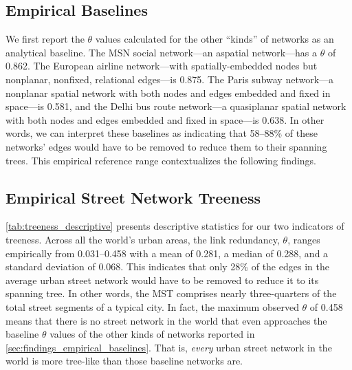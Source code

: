 \documentclass[12pt,letterpaper]{article} %
\begin{document}
\subsection{Empirical Baselines}\label{sec:findings_empirical_baselines}

We first report the $\theta$ values calculated for the other \enquote{kinds} of networks as an analytical baseline. The MSN social network---an aspatial network---has a $\theta$ of 0.862. The European airline network---with spatially-embedded nodes but nonplanar, nonfixed, relational edges---is 0.875. The Paris subway network---a nonplanar spatial network with both nodes and edges embedded and fixed in space---is 0.581, and the Delhi bus route network---a quasiplanar spatial network with both nodes and edges embedded and fixed in space---is 0.638. In other words, we can interpret these baselines as indicating that 58--88\% of these networks' edges would have to be removed to reduce them to their spanning trees. This empirical reference range contextualizes the following findings.

\subsection{Empirical Street Network Treeness}

\autoref{tab:treeness_descriptive} presents descriptive statistics for our two indicators of treeness. Across all the world's urban areas, the link redundancy, $\theta$, ranges empirically from 0.031--0.458 with a mean of 0.281, a median of 0.288, and a standard deviation of 0.068. This indicates that only 28\% of the edges in the average urban street network would have to be removed to reduce it to its spanning tree. In other words, the MST comprises nearly three-quarters of the total street segments of a typical city. In fact, the maximum observed $\theta$ of 0.458 means that there is no street network in the world that even approaches the baseline $\theta$ values of the other kinds of networks reported in \autoref{sec:findings_empirical_baselines}. That is, \textit{every} urban street network in the world is more tree-like than those baseline networks are.
\end{document}

